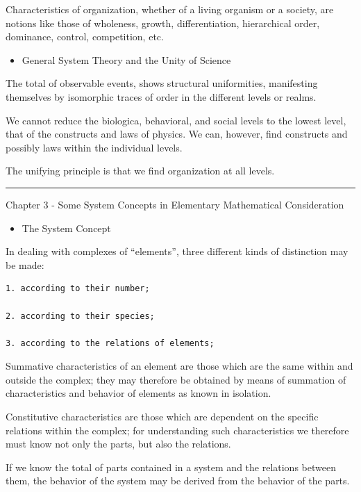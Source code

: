 \documentclass[
]{book}
\providecommand{\tightlist}{%
  \setlength{\itemsep}{0pt}\setlength{\parskip}{0pt}}
\begin{document}
Characteristics of organization, whether of a living organism or a society, are notions like those of wholeness, growth, differentiation, hierarchical order, dominance, control, competition, etc.

\begin{itemize}
\tightlist
\item
  General System Theory and the Unity of Science
\end{itemize}

The total of observable events, shows structural uniformities, manifesting themselves by isomorphic traces of order in the different levels or realms.

We cannot reduce the biologica, behavioral, and social levels to the lowest level, that of the constructs and laws of physics. We can, however, find constructs and possibly laws within the individual levels.

The unifying principle is that we find organization at all levels.

\begin{center}\rule{0.5\linewidth}{0.5pt}\end{center}

Chapter 3 - Some System Concepts in Elementary Mathematical Consideration

\begin{itemize}
\tightlist
\item
  The System Concept
\end{itemize}

In dealing with complexes of ``elements'', three different kinds of distinction may be made:

\begin{verbatim}
1. according to their number;

2. according to their species;

3. according to the relations of elements;
\end{verbatim}

Summative characteristics of an element are those which are the same within and outside the complex; they may therefore be obtained by means of summation of characteristics and behavior of elements as known in isolation.

Constitutive characteristics are those which are dependent on the specific relations within the complex; for understanding such characteristics we therefore must know not only the parts, but also the relations.

If we know the total of parts contained in a system and the relations between them, the behavior of the system may be derived from the behavior of the parts.
\end{document}
